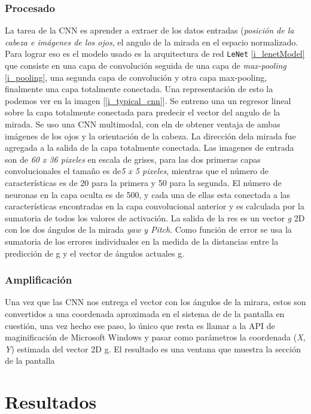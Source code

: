 \documentclass[12pt]{book} %
\begin{document}
	\subsection{Procesado}
		La tarea de la CNN es aprender a extraer de los datos entradas (\textit{posición de la cabeza e imágenes de los ojos}, el angulo de la
		mirada en el espacio normalizado.
		Para lograr eso es el modelo usado es la arquitectura de red \texttt{LeNet} \ref{i_lenetModel} que consiste en una capa de convolución 
		seguida de una capa 	de \textit{max-pooling} \ref{i_pooling}, una segunda capa de convolución y otra capa max-pooling, finalmente una 
		capa totalmente conectada.
		Una representación de esto la podemos ver en la imagen [\ref{i_typical_cnn}].
		Se entreno una un regresor lineal sobre la capa totalmente conectada para predecir el vector del angulo de la mirada. Se uso una 
		CNN multimodal, con eln de obtener ventaja de ambas imágenes de los ojos y la orientación de la cabeza.
		La dirección dela mirada fue agregada a la salida de la capa totalmente conectada.
		Las imagenes de entrada son de \textit{60 x 36 pixeles} en escala de grises, para las dos primeras capas convolucionales el tamaño
		es de\textit{5 x 5 pixeles}, mientras que el número de características es de 20 para la primera y 50 para la segunda. El número de 
		neuronas en la capa oculta es de 500, y cada una de ellas esta conectada a las características encontradas en la capa convolucional 
		anterior y es calculada por la sumatoria de todos los valores de activación. La salida de la res es un vector \textit{g} 2D 
		con los dos ángulos de la mirada \textit{yaw y Pitch}. Como función de error se usa la sumatoria de los errores individuales en la
		medida de la distancias entre la predicción de g y el vector de ángulos actuales g.
		
	\subsection{Amplificación}
		Una 	vez que las CNN nos entrega el vector con los ángulos de la mirara, estos son convertidos a una coordenada aproximada en 
		el sistema de de la pantalla en cuestión, una vez hecho ese paso, lo único que resta es llamar a la API de maginificación de 
		Microsoft Windows y pasar como parámetros la coordenada (\textit{X, Y}) estimada del vector 2D g.
		El resultado es una ventana que muestra la sección de la pantalla
	
\newpage	

\chapter*{Resultados}
\markboth{}{}
\thispagestyle{empty}
\lhead[\thepage]{}
\rhead[]{\thepage}
\end{document}
